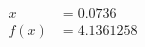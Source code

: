 \documentclass[preview]{standalone}
\begin{document}
\begin{align*}
x &= 0.0736\\f(x) &= 4.1361258
\end{align*}
\end{document}
